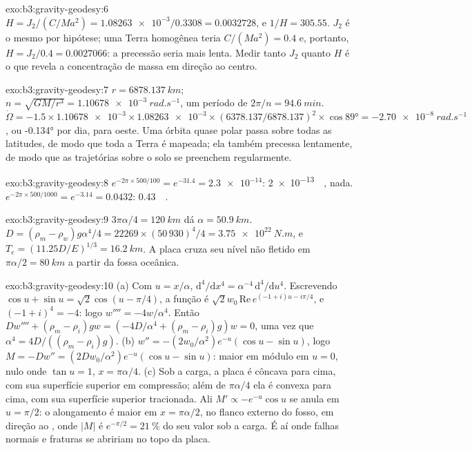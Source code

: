 \begin{solution}{exo:b3:gravity-geodesy:6}
$H = J_2/(C/Ma^2) = \num{1.08263e-3}/0.3308 = \num{0.0032728}$, e
$1/H = 305.55$. $J_2$ é o mesmo por hipótese; uma Terra homogênea teria
$C/(Ma^2) = 0.4$ e, portanto, $H = J_2/0.4 = \num{0.0027066}$: a precessão seria
mais lenta. Medir tanto $J_2$ quanto $H$ é o que revela a concentração de massa
em direção ao centro.
\end{solution}

\begin{solution}{exo:b3:gravity-geodesy:7}
$r = \qty{6878.137}{km}$; $n = \sqrt{GM/r^3} = \qty{1.10678e-3}{rad.s^{-1}}$, um
período de $2\pi/n = \qty{94.6}{min}$. $\dot\Omega = -1.5\times\num{1.10678e-3}
\times\num{1.08263e-3}\times(6378.137/6878.137)^2\times\cos\ang{89} =
\qty{-2.70e-8}{rad.s^{-1}}$, ou \ang{-0.134} por dia, para oeste. Uma órbita quase polar
passa sobre todas as latitudes, de modo que toda a Terra é mapeada; ela também precessa
lentamente, de modo que as trajetórias sobre o solo se preenchem regularmente.
\end{solution}

\begin{solution}{exo:b3:gravity-geodesy:8}
$e^{-2\pi\times500/100} = e^{-31.4} = \num{2.3e-14}$: \qty{2e-13}{\milli\gal},
nada. $e^{-2\pi\times500/1000} = e^{-3.14} = 0.0432$:
\qty{0.43}{\milli\gal}.
\end{solution}

\begin{solution}{exo:b3:gravity-geodesy:9}
$3\pi\alpha/4 = \qty{120}{km}$ dá $\alpha = \qty{50.9}{km}$.
$D = (\rho_m - \rho_w)g\alpha^4/4 = 22269\times(50\,930)^4/4 =
\qty{3.75e22}{N.m}$, e $T_e = (11.25D/E)^{1/3} = \qty{16.2}{km}$. A placa
cruza seu nível não fletido em $\pi\alpha/2 = \qty{80}{km}$ a partir da fossa oceânica.
\end{solution}

\begin{solution}{exo:b3:gravity-geodesy:10}
(a) Com $u = x/\alpha$, $\mathrm d^4/\mathrm dx^4 = \alpha^{-4}\,\mathrm
d^4/\mathrm du^4$. Escrevendo $\cos u + \sin u = \sqrt2\cos(u - \pi/4)$, a
função é $\sqrt2w_0\,\mathrm{Re}\,e^{(-1 + i)u - i\pi/4}$, e
$(-1 + i)^4 = -4$: logo $w'''' = -4w/\alpha^4$. Então $Dw'''' + (\rho_m -
\rho_i)gw = (-4D/\alpha^4 + (\rho_m - \rho_i)g)w = 0$, uma vez que $\alpha^4 =
4D/((\rho_m - \rho_i)g)$. (b) $w'' = -(2w_0/\alpha^2)e^{-u}(\cos u - \sin u)$, logo
$M = -Dw'' = (2Dw_0/\alpha^2)e^{-u}(\cos u - \sin u)$: maior em módulo em
$u = 0$, nulo onde $\tan u = 1$, $x = \pi\alpha/4$. (c) Sob a carga, a
placa é côncava para cima, com sua superfície superior em compressão; além de $\pi\alpha/4$
ela é convexa para cima, com sua superfície superior tracionada. Ali $M' \propto
-e^{-u}\cos u$ se anula em $u = \pi/2$: o alongamento é maior em
$x = \pi\alpha/2$, no flanco externo do fosso, em direção ao , onde
$|M|$ é $e^{-\pi/2} = \qty{21}{\percent}$ do seu valor sob a carga. É aí
onde falhas normais e fraturas se abririam no topo da placa.
\end{solution}

